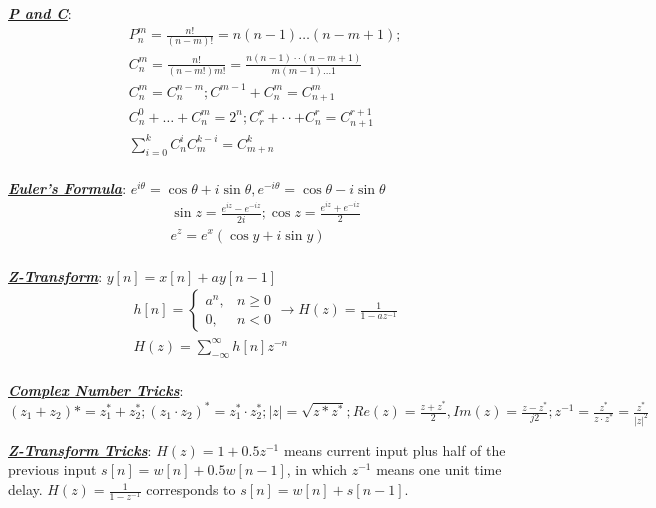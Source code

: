 \documentclass[12pt]{article}
\newcommand{\bulletPoint}[1]{\ul{\textit{\textbf{#1}}}}
\begin{document}
\begin{multicols*}{4}
\bulletPoint{P and C}:
\useshortskip \begin{equation*}
    \begin{split}
        & P^m_n = \frac{n!}{(n-m)!}=n(n-1)\ldots(n-m+1);\\[-3pt]
        & C^m_n = \frac{n!}{(n-m!)m!} = \frac{n(n-1)\cdot\cdot(n-m+1)}{m(m-1)\ldots1}\\[-3pt]
        & C^m_n = C^{n-m}_n; C^{m-1}+C^m_n=C^m_{n+1}\\[-3pt]
        & C^0_n+\ldots+C^m_n=2^n; C^r_r+\cdot\cdot+C^r_n=C^{r+1}_{n+1}\\[-5pt]
        & \sum^k_{i=0}C^i_nC^{k-i}_m=C^k_{m+n}\\[-7pt]
    \end{split}
\end{equation*}


\bulletPoint{Euler's Formula}: $e^{i\theta} = \cos \theta + i \sin \theta, e^{-i\theta} = \cos \theta - i \sin \theta$
\useshortskip \begin{equation*}
    \begin{split}
        & \sin z = \frac{e^{iz} - e^{-iz}}{2i}; \cos z = \frac{e^{iz} + e^{-iz}}{2}\\[-3pt]
        & e^z = e^x(\cos y + i\sin y)\\[-7pt]
    \end{split}
\end{equation*}


\bulletPoint{Z-Transform}: $y[n] = x[n] + ay[n-1]$
\useshortskip \begin{equation*}
    \begin{split}
        & h[n] = 
        \begin{cases}
            a^n, & n\geq 0\\
            0, & n<0
        \end{cases} \rightarrow
        H(z) = \frac{1}{1-az^{-1}}\\[-3pt]
        & H(z) = \sum^\infty_{-\infty}h[n]z^{-n}\\[-7pt]
    \end{split}
\end{equation*}


\bulletPoint{Complex Number Tricks}: $(z_1 + z_2)* = z^*_1 + z^*_2; (z_1 \cdot z_2)^{*} = z^*_1 \cdot z^*_2; |z| = \sqrt{z * z^*}; Re(z)=\frac{z+z^*}{2}, Im(z)=\frac{z-z^*}{j2}; z^{-1}=\frac{z^*}{z\cdot z^*} = \frac{z^*}{|z|^2}$

\bulletPoint{Z-Transform Tricks}: $H(z)=1+0.5z^{-1}$ means current input plus half of the previous input $s[n]=w[n]+0.5w[n-1]$, in which $z^{-1}$ means one unit time delay. $H(z)=\frac{1}{1-z^{-1}}$ corresponds to $s[n]=w[n]+s[n-1]$.


\end{multicols*}
\end{document}
